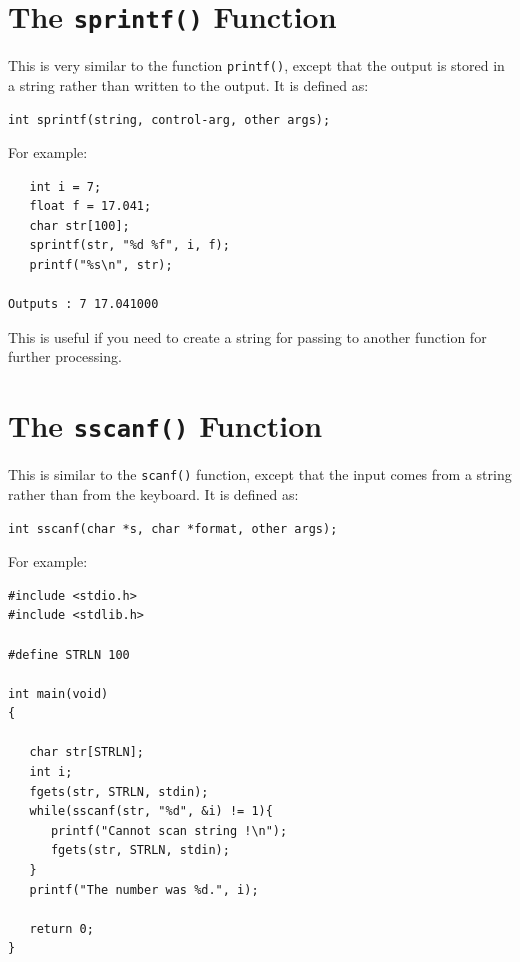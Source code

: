 \documentclass[a4,portraitt]{slides}
\begin{document}
\section*{The {\tt sprintf()} Function}
This is very similar to the function \verb^printf()^, except
that the output is stored in a string rather than written
to the output.
It is defined as:
\vspace{-0.75em}
{\small
\begin{verbatim}
int sprintf(string, control-arg, other args);
\end{verbatim}
}
\vspace{-0.75em}
For example:
\vspace{-0.75em}
\begin{verbatim}
   int i = 7;
   float f = 17.041;
   char str[100];
   sprintf(str, "%d %f", i, f);
   printf("%s\n", str);

Outputs : 7 17.041000
\end{verbatim}
\vspace{-0.75em}
This is useful if you need to create a string for passing
to another function for further processing.

\newpage
\section*{The {\tt sscanf()} Function}
This is similar to the \verb^scanf()^ function, except
that the input comes from a string rather than from the keyboard.
It is defined as:
\vspace{-0.75em}
{\small
\begin{verbatim}
int sscanf(char *s, char *format, other args);
\end{verbatim}
}
\vspace{-0.75em}
For example:
\vspace{-0.75em}
\begin{small}
\begin{verbatim}
#include <stdio.h>
#include <stdlib.h>

#define STRLN 100

int main(void)
{

   char str[STRLN];
   int i;
   fgets(str, STRLN, stdin);
   while(sscanf(str, "%d", &i) != 1){
      printf("Cannot scan string !\n");
      fgets(str, STRLN, stdin);
   }
   printf("The number was %d.", i);

   return 0;
}
\end{verbatim}
\vspace{-0.75em}
\end{small}
\end{document}
